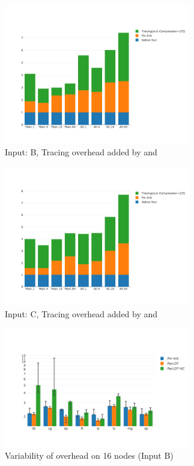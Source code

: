 \begin{figure}[!t]
\centering
\includegraphics[width=3.2in]{figs.comet.newMed/comet_chartDet_B_woc_byTool_p3_5.png}
\caption{ Input: B, Tracing overhead added by \pininit and \parlotnc
}
\label{comet_chartDet_B_woc_byTool_p3_5}
\end{figure}

\begin{figure}[!t]
\centering
\includegraphics[width=3.2in]{figs.comet.newMed/comet_chartDet_C_woc_byTool_p3_5.png}
\caption{ Input: C, Tracing overhead added by \pininit and \parlotnc}
\label{comet_chartDet_C_woc_byTool_p3_5}
\end{figure}




\begin{figure}[!t]
\centering
\includegraphics[width=3.2in]{figs.comet.newMed/comet_BX2_Main_16_B_p3_5.png}
\caption{ Variability of \parlotm overhead on 16 nodes (Input B)
}
\label{comet_BX2_Main_16_B_p3_5}
\end{figure}

